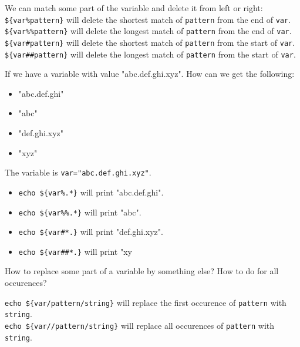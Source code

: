 \begin{definition}
  We can match some part of the variable and delete it from left or right: \\
  \texttt{\$\{var\%pattern\}} will delete the shortest match of \texttt{pattern} from the end of \texttt{var}. \\
  \texttt{\$\{var\%\%pattern\}} will delete the longest match of \texttt{pattern} from the end of \texttt{var}. \\
  \texttt{\$\{var\#pattern\}} will delete the shortest match of \texttt{pattern} from the start of \texttt{var}. \\
  \texttt{\$\{var\#\#pattern\}} will delete the longest match of \texttt{pattern} from the start of \texttt{var}.
\end{definition}

\begin{qs}
  If we have a variable with value "abc.def.ghi.xyz". How can we get the following:
  \begin{itemize}
    \item "abc.def.ghi"
    \item "abc"
    \item "def.ghi.xyz"
    \item "xyz"
  \end{itemize}
\end{qs}

\begin{ans}
  The variable is \texttt{var="abc.def.ghi.xyz"}.
  \begin{itemize}
    \item \texttt{echo \$\{var\%.*\}} will print "abc.def.ghi".
    \item \texttt{echo \$\{var\%\%.*\}} will print "abc".
    \item \texttt{echo \$\{var\#*.\}} will print "def.ghi.xyz".
    \item \texttt{echo \$\{var\#\#*.\}} will print "xy
  \end{itemize}
\end{ans}


\begin{qs}
 How to replace some part of a variable by something else? How to do for all
  occurences?
\end{qs}

\begin{ans}
  \texttt{echo \$\{var/pattern/string\}} will replace the first occurence of \texttt{pattern} with \texttt{string}. \\
  \texttt{echo \$\{var//pattern/string\}} will replace all occurences of \texttt{pattern} with \texttt{string}.
\end{ans}

